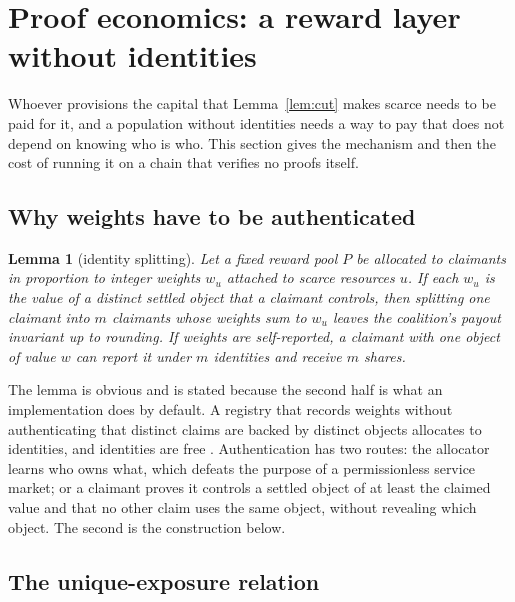 \documentclass[11pt]{article}
\theoremstyle{plain}
\newtheorem{lemma}{Lemma}
\theoremstyle{definition}
\theoremstyle{remark}
\begin{document}
\section{Proof economics: a reward layer without identities}
\label{sec:proofs}

Whoever provisions the capital that Lemma~\ref{lem:cut} makes scarce needs to be paid for it, and a population without identities needs a way to pay that does not depend on knowing who is who. This section gives the mechanism and then the cost of running it on a chain that verifies no proofs itself.

\subsection{Why weights have to be authenticated}

\begin{lemma}[identity splitting]
\label{lem:split}
Let a fixed reward pool $P$ be allocated to claimants in proportion to integer weights $w_u$ attached to scarce resources $u$. If each $w_u$ is the value of a distinct settled object that a claimant controls, then splitting one claimant into $m$ claimants whose weights sum to $w_u$ leaves the coalition's payout invariant up to rounding. If weights are self-reported, a claimant with one object of value $w$ can report it under $m$ identities and receive $m$ shares.
\end{lemma}

The lemma is obvious and is stated because the second half is what an implementation does by default. A registry that records weights without authenticating that distinct claims are backed by distinct objects allocates to identities, and identities are free \citep{douceur2002sybil}. Authentication has two routes: the allocator learns who owns what, which defeats the purpose of a permissionless service market; or a claimant proves it controls a settled object of at least the claimed value and that no other claim uses the same object, without revealing which object. The second is the construction below.

\subsection{The unique-exposure relation}
\end{document}
